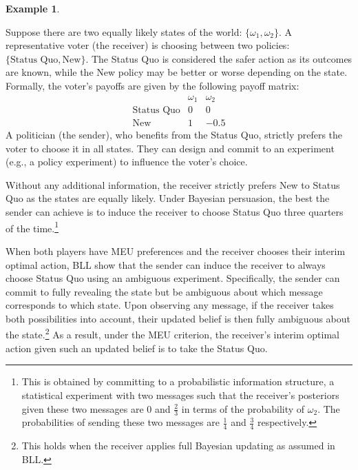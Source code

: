 \documentclass[12pt,a4paper]{article}
\theoremstyle{definition}
\newtheorem{example}{Example}[section]
\theoremstyle{remark}
\newenvironment{original}{%
    \par\medskip\noindent%
    \begin{tcolorbox}[%
        colback=white,%
        colframe=black!50,%
        title=\textbf{Original English},%
        fonttitle=\small\bfseries,%
        left=0pt, right=0pt, top=2pt, bottom=2pt,%
        boxrule=0.5pt,%
        arc=0pt,%
        outer arc=0pt%
    ]%
    \small%
}{%
    \end{tcolorbox}%
}
\begin{document}
\begin{example}\label{ex:1}
\begin{original}
Suppose there are two equally likely states of the world: $\{\omega_1, \omega_2\}$. A representative voter (the receiver) is choosing between two policies: $\{\text{Status Quo}, \text{New}\}$. The Status Quo is considered the safer action as its outcomes are known, while the New policy may be better or worse depending on the state. Formally, the voter's payoffs are given by the following payoff matrix:
\[
\begin{array}{c|cc}
 & \omega_1 & \omega_2 \\
\hline
\text{Status Quo} & 0 & 0 \\
\text{New} & 1 & -0.5
\end{array}
\]
A politician (the sender), who benefits from the Status Quo, strictly prefers the voter to choose it in all states. They can design and commit to an experiment (e.g., a policy experiment) to influence the voter's choice.

Without any additional information, the receiver strictly prefers New to Status Quo as the states are equally likely. Under Bayesian persuasion, the best the sender can achieve is to induce the receiver to choose Status Quo three quarters of the time.\footnote{This is obtained by committing to a probabilistic information structure, a statistical experiment with two messages such that the receiver's posteriors given these two messages are $0$ and $\frac{2}{3}$ in terms of the probability of $\omega_2$. The probabilities of sending these two messages are $\frac{1}{4}$ and $\frac{3}{4}$ respectively.}

When both players have MEU preferences and the receiver chooses their interim optimal action, BLL show that the sender can induce the receiver to always choose Status Quo using an ambiguous experiment. Specifically, the sender can commit to fully revealing the state but be ambiguous about which message corresponds to which state. Upon observing any message, if the receiver takes both possibilities into account, their updated belief is then fully ambiguous about the state.\footnote{This holds when the receiver applies full Bayesian updating as assumed in BLL.} As a result, under the MEU criterion, the receiver's interim optimal action given such an updated belief is to take the Status Quo.


\end{original}
\end{example}
\end{document}
